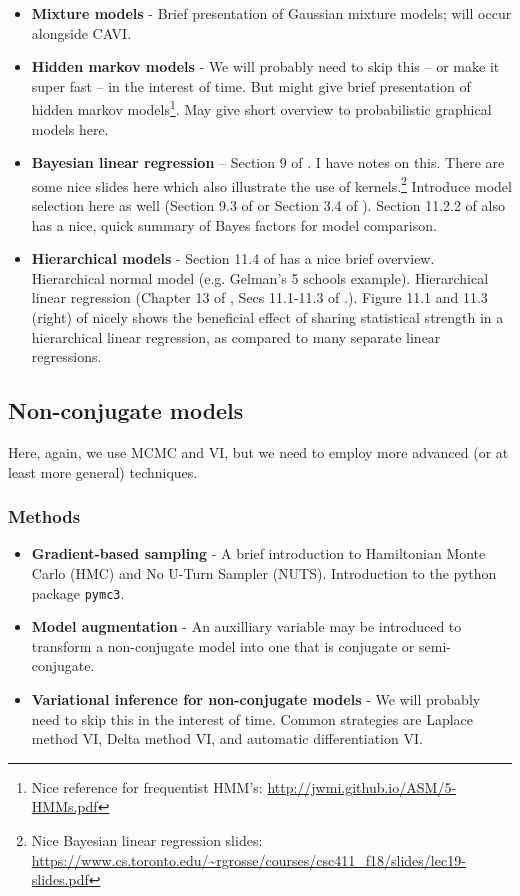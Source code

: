\documentclass{article} %
\begin{document}
\begin{itemize}
\item \textbf{Mixture models} - Brief presentation of Gaussian mixture models; will occur alongside CAVI.
\item \textbf{Hidden markov models} -   We will probably need to skip this -- or make it super fast -- in the interest of time.   But might give brief presentation of hidden markov models\footnote{Nice reference for frequentist HMM's: \url{http://jwmi.github.io/ASM/5-HMMs.pdf}}. May give short overview to probabilistic graphical models here.
\item \textbf{Bayesian linear regression} -- Section 9 of \cite{hoff2009first}.     I have notes on this.   There are some nice slides here which also illustrate the use of kernels.\footnote{Nice Bayesian linear regression slides: \url{https://www.cs.toronto.edu/~rgrosse/courses/csc411_f18/slides/lec19-slides.pdf}}   Introduce model selection here as well (Section 9.3 of \cite{hoff2009first} or Section 3.4 of \cite{bishop2006pattern}).   Section 11.2.2 of \cite{davison2003statistical} also has a nice,  quick summary of Bayes factors for model comparison.   
\item \textbf{Hierarchical models} - Section 11.4 of \cite{davison2003statistical} has a nice brief overview.    Hierarchical normal model (e.g. Gelman's 5 schools example).   Hierarchical linear regression (Chapter 13 of \cite{gelman2013bayesian},   Secs 11.1-11.3 of \cite{hoff2009first}.).  Figure 11.1 and 11.3 (right) of \cite{hoff2009first} nicely shows the beneficial effect of sharing statistical strength in a hierarchical linear regression,  as compared to many separate linear regressions.  
\end{itemize}

\subsection{Non-conjugate models} \label{sec:non_conjugacy}

Here, again, we use MCMC and VI, but we need to employ more advanced (or at least more general) techniques.

\subsubsection{Methods}

\begin{itemize}
	\item \textbf{Gradient-based sampling} - A brief introduction to Hamiltonian Monte Carlo (HMC) and No U-Turn Sampler (NUTS).  Introduction to the python package \texttt{pymc3}.
	\item \textbf{Model augmentation} - An auxilliary variable may be introduced to transform a non-conjugate model into one that is conjugate or semi-conjugate.
	\item \textbf{Variational inference for non-conjugate models} - We will probably need to skip this in the interest of time.  Common strategies are Laplace method VI,  Delta method VI, and automatic differentiation VI.
\end{itemize}
\end{document}
